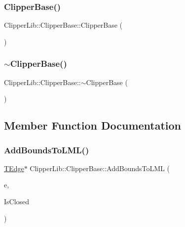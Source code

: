 \subsubsection{\texorpdfstring{ClipperBase()}{ClipperBase()}}
{\footnotesize\ttfamily Clipper\+Lib\+::\+Clipper\+Base\+::\+Clipper\+Base (\begin{DoxyParamCaption}{ }\end{DoxyParamCaption})}

\mbox{\label{class_clipper_lib_1_1_clipper_base_ae73a6a12fb3e7e62b59d1ff38135b27c}} 
\subsubsection{\texorpdfstring{$\sim$ClipperBase()}{~ClipperBase()}}
{\footnotesize\ttfamily Clipper\+Lib\+::\+Clipper\+Base\+::$\sim$\+Clipper\+Base (\begin{DoxyParamCaption}{ }\end{DoxyParamCaption})\hspace{0.3cm}{\ttfamily [virtual]}}



\subsection{Member Function Documentation}
\mbox{\label{class_clipper_lib_1_1_clipper_base_a906ea17c9dc8822d689e54c3243e7f58}} 
\subsubsection{\texorpdfstring{AddBoundsToLML()}{AddBoundsToLML()}}
{\footnotesize\ttfamily \mbox{\hyperlink{struct_clipper_lib_1_1_t_edge}{T\+Edge}}$\ast$ Clipper\+Lib\+::\+Clipper\+Base\+::\+Add\+Bounds\+To\+L\+ML (\begin{DoxyParamCaption}\item[{\mbox{\hyperlink{struct_clipper_lib_1_1_t_edge}{T\+Edge}} $\ast$}]{e,  }\item[{bool}]{Is\+Closed }\end{DoxyParamCaption})\hspace{0.3cm}{\ttfamily [protected]}}

